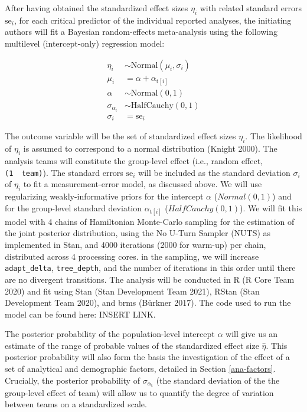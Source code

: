 \documentclass[
  12pt,
]{article}
\begin{document}
After having obtained the standardized effect sizes \(\eta_i\) with related standard errors \(\text{se}_i\), for each critical predictor of the individual reported analyses, the initiating authors will fit a Bayesian random-effects meta-analysis using the following multilevel (intercept-only) regression model:

\[
\begin{aligned}
\eta_i      & \sim \text{Normal}(\mu_i, \sigma_i) \\
\mu_i       & = \alpha + \alpha_{\text{t}[i]} \\
\alpha      & \sim \text{Normal}(0, 1) \\
\sigma_{\alpha_{\text{t}}} & \sim \text{HalfCauchy}(0, 1) \\
\sigma_i    & = \text{se}_i
\end{aligned}
\]

The outcome variable will be the set of standardized effect sizes \(\eta_i\).
The likelihood of \(\eta_i\) is assumed to correspond to a normal distribution (Knight 2000).
The analysis teams will constitute the group-level effect (i.e., random effect, \texttt{(1\ \textbar{}\ team)}).
The standard errors \(\text{se}_i\) will be included as the standard deviation \(\sigma_i\) of \(\eta_i\) to fit a measurement-error model, as discussed above.
We will use regularizing weakly-informative priors for the intercept \(\alpha\) (\(Normal(0, 1)\)) and for the group-level standard deviation \(\alpha_{\text{t}[i]}\) (\(HalfCauchy(0, 1)\)).
We will fit this model with 4 chains of Hamiltonian Monte-Carlo sampling for the estimation of the joint posterior distribution, using the No U-Turn Sampler (NUTS) as implemented in Stan, and 4000 iterations (2000 for warm-up) per chain, distributed across 4 processing cores.
 in the sampling, we will increase \texttt{adapt\_delta}, \texttt{tree\_depth}, and the number of iterations in this order until there are no divergent transitions.
The analysis will be conducted in R (R Core Team 2020) and fit using Stan (Stan Development Team 2021), RStan (Stan Development Team 2020), and brms (Bürkner 2017).
The code used to run the model can be found here: INSERT LINK.

The posterior probability of the population-level intercept \(\alpha\) will give us an estimate of the range of probable values of the standardized effect size \(\hat{\eta}\).
This posterior probability will also form the basis  the investigation of the effect of a set of analytical and demographic factors, detailed in Section \ref{ana-factors}.
Crucially, the posterior probability of \(\sigma_{\alpha_{\text{t}}}\) (the standard deviation of the the group-level effect of team) will allow us to quantify the degree of variation between teams on a standardized scale.
\end{document}
